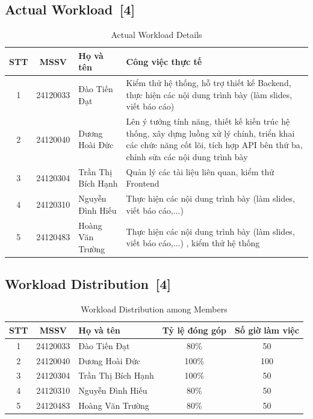 \documentclass[12pt, a4paper]{article}
\begin{document}
\subsection[Actual Workload]{Actual Workload \,{\normalfont\small\textcolor{cyan!70!black}{[4]}}}
\renewcommand{\arraystretch}{1.5}
\begin{table}[H]
    \centering
    \begin{tabularx}{\textwidth}{|c|c|l|X|}
    \hline
    \textbf{STT} & \textbf{MSSV} & \textbf{Họ và tên} & \textbf{Công việc thực tế} \\
    \hline
    1 & 24120033 & Đào Tiến Đạt & Kiểm thử hệ thống, hỗ trợ thiết kế Backend, thực hiện các nội dung trình bày (làm slides, viết báo cáo) \\[1cm]
    \hline
    2 & 24120040 & Dương Hoài Đức & Lên ý tưởng tính năng, thiết kế kiến trúc hệ thống, xây dựng luồng xử lý chính, triển khai các chức năng cốt lõi, tích hợp API bên thứ ba, chỉnh sửa các nội dung trình bày \\
    \hline
    3 & 24120304 & Trần Thị Bích Hạnh & Quản lý các tài liệu liên quan, kiểm thử Frontend \\[1cm]
    \hline
    4 & 24120310 & Nguyễn Đình Hiếu & Thực hiện các nội dung trình bày (làm slides, viết báo cáo,...) \\[1cm]
    \hline
    5 & 24120483 & Hoàng Văn Trường & Thực hiện các nội dung trình bày (làm slides, viết báo cáo,...) , kiểm thử hệ thống \\[1cm]
    \hline
    \end{tabularx}
    \caption{Actual Workload Details}
\end{table}

\subsection[Workload Distribution]{Workload Distribution \,{\normalfont\small\textcolor{cyan!70!black}{[4]}}}

\vspace{0.5cm}
\renewcommand{\arraystretch}{1.5}
\begin{table}[H]
    \centering
    \begin{tabularx}{\textwidth}{@{} c c X c c @{}}
    \toprule
    \textbf{STT} & \textbf{MSSV} & \textbf{Họ và tên} & \textbf{Tỷ lệ đóng góp} & \textbf{Số giờ làm việc} \\
    \midrule
    1 & 24120033 & Đào Tiến Đạt & 80\% & 50 \\[0.5cm]
    2 & 24120040 & Dương Hoài Đức & 100\% & 100 \\[0.5cm]
    3 & 24120304 & Trần Thị Bích Hạnh & 100\% & 50 \\[0.5cm]
    4 & 24120310 & Nguyễn Đình Hiếu & 80\% & 50 \\[0.5cm]
    5 & 24120483 & Hoàng Văn Trường & 80\% & 50 \\[0.5cm]
    \bottomrule
    \end{tabularx}
    \caption{Workload Distribution among Members}
\end{table}
\end{document}
